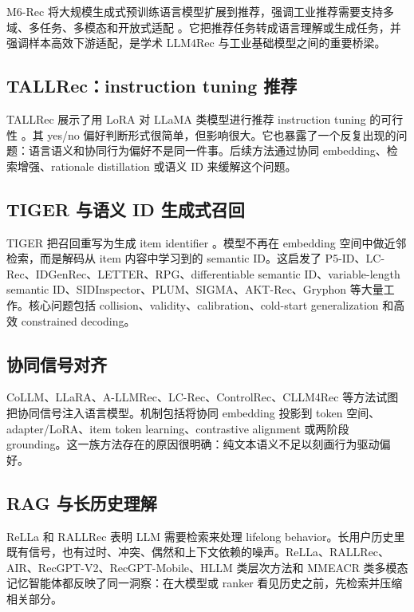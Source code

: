 \documentclass[UTF8,fontset=fandol,11pt]{ctexart}
\begin{document}
M6-Rec 将大规模生成式预训练语言模型扩展到推荐，强调工业推荐需要支持多域、多任务、多模态和开放式适配 \cite{m6rec}。它把推荐任务转成语言理解或生成任务，并强调样本高效下游适配，是学术 LLM4Rec 与工业基础模型之间的重要桥梁。

\subsection{TALLRec：instruction tuning 推荐}

TALLRec 展示了用 LoRA 对 LLaMA 类模型进行推荐 instruction tuning 的可行性 \cite{tallrec}。其 yes/no 偏好判断形式很简单，但影响很大。它也暴露了一个反复出现的问题：语言语义和协同行为偏好不是同一件事。后续方法通过协同 embedding、检索增强、rationale distillation 或语义 ID 来缓解这个问题。

\subsection{TIGER 与语义 ID 生成式召回}

TIGER 把召回重写为生成 item identifier \cite{tiger}。模型不再在 embedding 空间中做近邻检索，而是解码从 item 内容中学习到的 semantic ID。这启发了 P5-ID、LC-Rec、IDGenRec、LETTER、RPG、differentiable semantic ID、variable-length semantic ID、SIDInspector、PLUM、SIGMA、AKT-Rec、Gryphon 等大量工作。核心问题包括 collision、validity、calibration、cold-start generalization 和高效 constrained decoding。

\subsection{协同信号对齐}

CoLLM、LLaRA、A-LLMRec、LC-Rec、ControlRec、CLLM4Rec 等方法试图把协同信号注入语言模型。机制包括将协同 embedding 投影到 token 空间、adapter/LoRA、item token learning、contrastive alignment 或两阶段 grounding。这一族方法存在的原因很明确：纯文本语义不足以刻画行为驱动偏好。

\subsection{RAG 与长历史理解}

ReLLa 和 RALLRec 表明 LLM 需要检索来处理 lifelong behavior。长用户历史里既有信号，也有过时、冲突、偶然和上下文依赖的噪声。ReLLa、RALLRec、AIR、RecGPT-V2、RecGPT-Mobile、HLLM 类层次方法和 MMEACR 类多模态记忆智能体都反映了同一洞察：在大模型或 ranker 看见历史之前，先检索并压缩相关部分。
\end{document}
